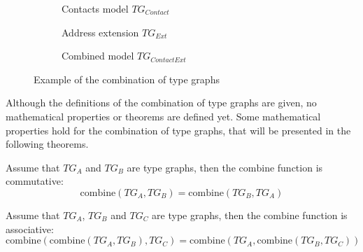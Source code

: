 \begin{figure}
    \centering
    \begin{subfigure}{0.3\textwidth}
        \centering
        
        \caption{Contacts model $TG_{Contact}$}
        \label{fig:transformation_framework:type_models_and_type_graphs:combining_type_graphs:combine_example_ig1}
    \end{subfigure}
    \begin{subfigure}{0.3\textwidth}
        \centering
        
        \caption{Address extension $TG_{Ext}$}
        \label{fig:transformation_framework:type_models_and_type_graphs:combining_type_graphs:combine_example_tg2}
    \end{subfigure}
    \begin{subfigure}{0.35\textwidth}
        \centering
        
        \caption{Combined model $TG_{ContactExt}$}
        \label{fig:transformation_framework:type_models_and_type_graphs:combining_type_graphs:combine_example_tg12}
    \end{subfigure}
    \caption{Example of the combination of type graphs}
    \label{fig:transformation_framework:type_models_and_type_graphs:combining_type_graphs:combine_example}
\end{figure}

Although the definitions of the combination of type graphs are given, no mathematical properties or theorems are defined yet. Some mathematical properties hold for the combination of type graphs, that will be presented in the following theorems.

\begin{thm}
\label{defin:transformation_framework:type_models_and_type_graphs:combining_type_graphs:tg_combine_commute}
Assume that $TG_A$ and $TG_B$ are type graphs, then the $\mathrm{combine}$ function is commutative:
\begin{equation*}
    \mathrm{combine}(TG_A, TG_B) = \mathrm{combine}(TG_B, TG_A)
\end{equation*}
\end{thm}

\begin{thm}
\label{defin:transformation_framework:type_models_and_type_graphs:combining_type_graphs:tg_combine_assoc}
Assume that $TG_A$, $TG_B$ and $TG_C$ are type graphs, then the $\mathrm{combine}$ function is associative:
\begin{equation*}
    \mathrm{combine}(\mathrm{combine}(TG_A, TG_B), TG_C) = \mathrm{combine}(TG_A, \mathrm{combine}(TG_B, TG_C))
\end{equation*}
\end{thm}

